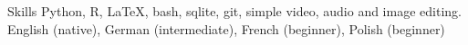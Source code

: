 
\begin{rubric}{Skills}
	Python, R, \LaTeX, bash, {\sc sqlite}, git, simple video, audio and image editing.
    English (native), German (intermediate), French (beginner), Polish (beginner)
\end{rubric}
